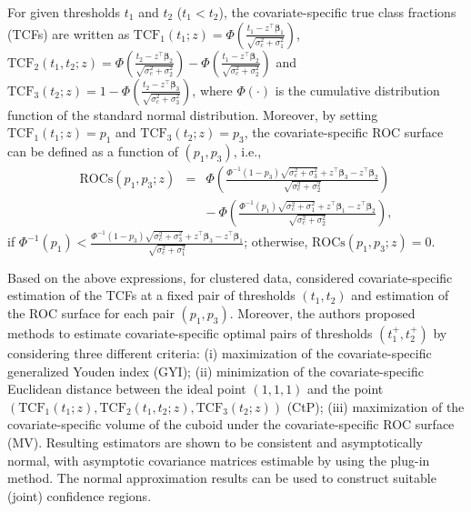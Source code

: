 For given thresholds $t_1$ and $t_2$ ($t_1 < t_2$), the covariate-specific true class fractions (TCFs) are written as $\mathrm{TCF}_1(t_1;z) = \Phi\left(\frac{t_1 - z^\top \boldsymbol{\beta}_1}{\sqrt{\sigma^2_c + \sigma^2_1}}\right)$, $\mathrm{TCF}_2(t_1, t_2;z) = \Phi\left(\frac{t_2 - z^\top \boldsymbol{\beta}_2}{\sqrt{\sigma^2_c + \sigma^2_2}}\right) - \Phi\left(\frac{t_1 - z^\top \boldsymbol{\beta}_2}{\sqrt{\sigma^2_c + \sigma^2_2}}\right)$ and $\mathrm{TCF}_3(t_2;z) = 1 - \Phi\left(\frac{t_2 - z^\top \boldsymbol{\beta}_3}{\sqrt{\sigma^2_c + \sigma^2_3}}\right)$, where $\Phi(\cdot)$ is the cumulative distribution function of the standard normal distribution. Moreover, by setting $\mathrm{TCF}_1(t_1;z) = p_1$ and $\mathrm{TCF}_3(t_2;z) = p_3$, the covariate-specific ROC surface can be defined as a function of $(p_1, p_3)$, i.e., \begin{eqnarray}
\mathrm{ROCs}(p_1, p_3; z) &=& \Phi\left(\frac{\Phi^{-1}(1 - p_3)\sqrt{\sigma^2_c + \sigma^2_3} + z^\top \boldsymbol{\beta}_3 - z^\top \boldsymbol{\beta}_2}{\sqrt{\sigma^2_c + \sigma^2_2}}\right) \nonumber \\
&& - \: \Phi\left(\frac{\Phi^{-1}(p_1)\sqrt{\sigma^2_c + \sigma^2_1} + z^\top \boldsymbol{\beta}_1 - z^\top \boldsymbol{\beta}_2}{\sqrt{\sigma^2_c + \sigma^2_2}}\right), \label{eq:rocs}
\end{eqnarray}
if
$\Phi^{-1}(p_1) < \frac{\Phi^{-1}(1 - p_3)\sqrt{\sigma^2_c + \sigma^2_3} + z^\top \boldsymbol{\beta}_3 - z^\top \boldsymbol{\beta}_1}{\sqrt{\sigma^2_c + \sigma^2_1}}$; otherwise, $\mathrm{ROCs}(p_1, p_3; z) = 0$.

Based on the above expressions, for clustered data, \citet{khanh2022} considered covariate-specific estimation of the TCFs at a fixed pair of thresholds $(t_1, t_2)$ and estimation of the ROC surface for each pair $(p_1, p_3)$. Moreover, the authors proposed methods to estimate covariate-specific optimal pairs of thresholds $(t_1^+, t_2^+)$ by considering three different criteria: (i) maximization of the covariate-specific generalized Youden index (GYI); (ii) minimization of the covariate-specific Euclidean distance between the ideal point $(1, 1, 1)$ and the point $\left(\mathrm{TCF}_1(t_1;z), \mathrm{TCF}_2(t_1, t_2;z), \mathrm{TCF}_3(t_2;z)\right)$ (CtP); (iii) maximization of the covariate-specific volume of the cuboid under the covariate-specific ROC surface (MV). Resulting estimators are shown to be consistent and asymptotically normal, with asymptotic covariance matrices estimable by using the plug-in method. The normal approximation results can be used to construct suitable (joint) confidence regions.

